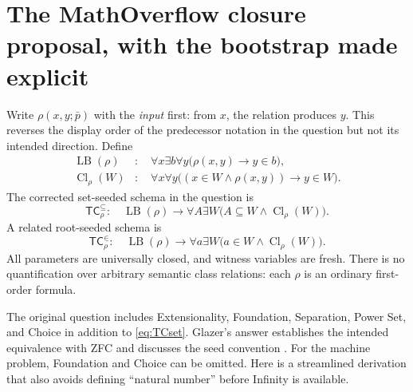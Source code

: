\documentclass[11pt,letterpaper]{article}
\theoremstyle{definition}\newtheorem{definition}[theorem]{Definition}
\theoremstyle{remark}\newtheorem{remark}[theorem]{Remark}
\newcommand{\TC}{\mathsf{TC}}
\newcommand{\ps}{\bar p}
\newcommand{\LB}{\operatorname{LB}}
\newcommand{\Cl}{\operatorname{Cl}}
\begin{document}
\section{The MathOverflow closure proposal, with the bootstrap made explicit}
\label{sec:MO}

Write $\rho(x,y;\ps)$ with the \emph{input} first: from $x$, the relation
produces $y$. This reverses the display order of the predecessor notation
in the question but not its intended direction. Define
\begin{align}
 \LB(\rho)&:\quad
   \forall x\exists b\forall y\bigl(\rho(x,y)\to y\in b\bigr),\label{eq:LB}\\
 \Cl_\rho(W)&:\quad
   \forall x\forall y\bigl((x\in W\land\rho(x,y))\to y\in W\bigr).
\end{align}
The corrected set-seeded schema in the question is
\begin{equation}\label{eq:TCset}
 \TC^{\subseteq}_\rho:\quad
 \LB(\rho)\to\forall A\exists W
       \bigl(A\subseteq W\land\Cl_\rho(W)\bigr).
\end{equation}
A related root-seeded schema is
\begin{equation}\label{eq:TCroot}
 \TC^{\in}_\rho:\quad
 \LB(\rho)\to\forall a\exists W
       \bigl(a\in W\land\Cl_\rho(W)\bigr).
\end{equation}
All parameters are universally closed, and witness variables are fresh.
There is no quantification over arbitrary semantic class relations: each
$\rho$ is an ordinary first-order formula.

The original question includes Extensionality, Foundation, Separation,
Power Set, and Choice in addition to \eqref{eq:TCset}. Glazer's answer
establishes the intended equivalence with ZFC and discusses the seed
convention \cite{mo}. For the machine problem, Foundation and Choice can
be omitted. Here is a streamlined derivation that also avoids defining
``natural number'' before Infinity is available.
\end{document}
